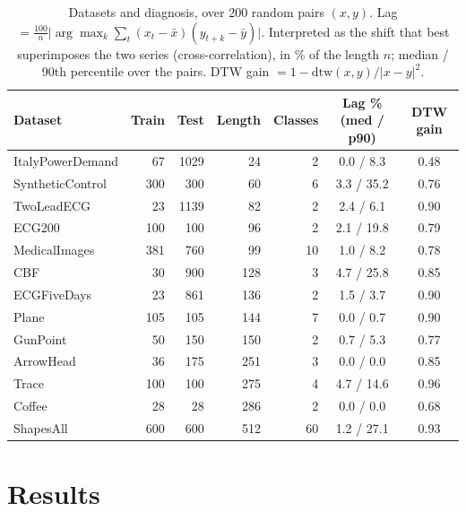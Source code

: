 \documentclass[11pt]{article}
\begin{document}
\begin{table}[t]
\centering\small
\caption{Datasets and diagnosis, over 200 random pairs $(x,y)$. Lag $=\frac{100}{n}\big|\arg\max_k \sum_t (x_t-\bar x)(y_{t+k}-\bar y)\big|$. Interpreted as the shift that best superimposes the two series (cross-correlation), in \% of the length $n$; median / 90th percentile over the pairs. DTW gain $=1-\mathrm{dtw}(x,y)/|x-y|^2$.}
\label{tab:data}
\begin{tabular}{lrrrrcc}
\toprule
Dataset & Train & Test & Length & Classes & Lag \% (med / p90) & DTW gain \\
\midrule
ItalyPowerDemand & 67 & 1029 & 24 & 2 & 0.0 / 8.3 & 0.48 \\
SyntheticControl & 300 & 300 & 60 & 6 & 3.3 / 35.2 & 0.76 \\
TwoLeadECG & 23 & 1139 & 82 & 2 & 2.4 / 6.1 & 0.90 \\
ECG200 & 100 & 100 & 96 & 2 & 2.1 / 19.8 & 0.79 \\
MedicalImages & 381 & 760 & 99 & 10 & 1.0 / 8.2 & 0.78 \\
CBF & 30 & 900 & 128 & 3 & 4.7 / 25.8 & 0.85 \\
ECGFiveDays & 23 & 861 & 136 & 2 & 1.5 / 3.7 & 0.90 \\
Plane & 105 & 105 & 144 & 7 & 0.0 / 0.7 & 0.90 \\
GunPoint & 50 & 150 & 150 & 2 & 0.7 / 5.3 & 0.77 \\
ArrowHead & 36 & 175 & 251 & 3 & 0.0 / 0.0 & 0.85 \\
Trace & 100 & 100 & 275 & 4 & 4.7 / 14.6 & 0.96 \\
Coffee & 28 & 28 & 286 & 2 & 0.0 / 0.0 & 0.68 \\
ShapesAll & 600 & 600 & 512 & 60 & 1.2 / 27.1 & 0.93 \\
\bottomrule
\end{tabular}
\end{table}

\section{Results}
\end{document}
